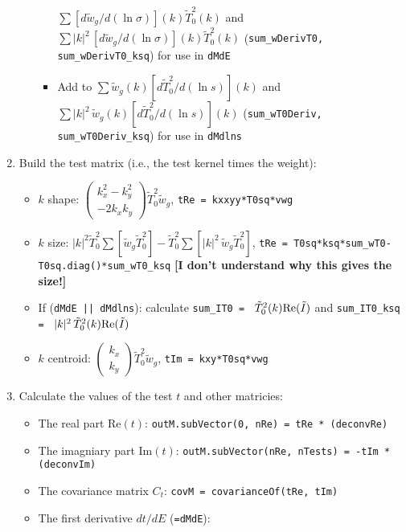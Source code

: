 \documentclass[useAMS,usenatbib,usegraphicx]{mn2e}
\begin{document}
\begin{enumerate}
\begin{itemize}
\begin{itemize}
      $\sum[d\tilde{w}_g/d(\ln \sigma)](k) \tilde{T}^2_0(k)$ and 
      $\sum |k|^2 \,[d\tilde{w}_g/d(\ln \sigma)](k) \tilde{T}^2_0(k)$ 
      ({\tt sum\_wDerivT0, sum\_wDerivT0\_ksq}) for use in {\tt dMdE}
    \item Add to $\sum\tilde{w}_g(k) [d\tilde{T}^2_0/d(\ln s)](k)$ and 
      $\sum |k|^2\, \tilde{w}_g(k) [d\tilde{T}^2_0/d(\ln s)](k)$ 
      ({\tt sum\_wT0Deriv, sum\_wT0Deriv\_ksq}) for use in {\tt dMdlns}
    \end{itemize}
  \end{itemize}
\item Build the test matrix (i.e., the test kernel times the weight):
  \begin{itemize}
  \item $k$ shape: $\left(\begin{smallmatrix} k_x^2 - k_y^2 \\ -2k_x k_y \end{smallmatrix}\right)
    \tilde{T}^2_0 \tilde{w}_g$, {\tt tRe = kxxyy*T0sq*vwg}
  \item $k$ size: $ |k|^2 \tilde{T}^2_0 \sum[\tilde{w}_g \tilde{T}_0^2] - 
    \tilde{T}^2_0\sum[|k|^2 \,\tilde{w}_g \tilde{T}_0^2]$, 
          {\tt tRe = T0sq*ksq*sum\_wT0-T0sq.diag()*sum\_wT0\_ksq}
          {\bf [I don't understand why this gives the size!]}
  \item If ({\tt dMdE || dMdlns}): calculate {\tt sum\_IT0 = } $\tilde{T}_0^2(k) {\rm Re}(\tilde{I})$
    and {\tt sum\_IT0\_ksq = } $|k|^2\,\tilde{T}_0^2(k) {\rm Re}(\tilde{I})$
  \item $k$ centroid: $\left(\begin{smallmatrix}k_x\\k_y\end{smallmatrix}\right) \tilde{T}^2_0 \tilde{w}_g$, {\tt tIm = kxy*T0sq*vwg}
  \end{itemize}
\item Calculate the values of the test $t$ and other matricies:
  \begin{itemize}
  \item The real part Re$(t)$: {\tt outM.subVector(0, nRe) = tRe * (deconvRe)}
  \item The imagniary part Im$(t)$: {\tt outM.subVector(nRe, nTests) = -tIm * (deconvIm)}
  \item The covariance matrix $C_t$: {\tt covM = covarianceOf(tRe, tIm)}
  \item The first derivative $dt/dE$ ({\tt =dMdE}): 
    \begin{itemize}

\end{itemize}
\end{itemize}
\end{enumerate}
\end{document}
